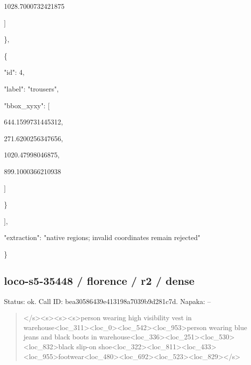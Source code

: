 \documentclass[10pt,a4paper]{article}
\begin{document}
        1028.7000732421875\par
      ]\par
    \},\allowbreak{}\par
    \{\par
      "id":\allowbreak{} 4,\allowbreak{}\par
      "label":\allowbreak{} "trousers",\allowbreak{}\par
      "bbox\_xyxy":\allowbreak{} [\par
        644.1599731445312,\allowbreak{}\par
        271.6200256347656,\allowbreak{}\par
        1020.47998046875,\allowbreak{}\par
        899.1000366210938\par
      ]\par
    \}\par
  ],\allowbreak{}\par
  "extraction":\allowbreak{} "native regions; invalid coordinates remain rejected"\par
\}
\subsection*{loco-s5-35448 / florence / r2 / dense}
Status: ok. Call ID: bea30586439e413198a7039b9d281c7d. Napaka: --
\begin{quote}\footnotesize
</s>\allowbreak{}<s>\allowbreak{}<s>\allowbreak{}<s>\allowbreak{}person wearing high visibility vest in warehouse<loc\_311>\allowbreak{}<loc\_0>\allowbreak{}<loc\_54\allowbreak{}2>\allowbreak{}<loc\_953>\allowbreak{}person wearing blue jeans and black boots in warehouse<loc\_336>\allowbreak{}<loc\_251>\allowbreak{}<loc\_\allowbreak{}530>\allowbreak{}<loc\_832>\allowbreak{}black slip-on shoe<loc\_322>\allowbreak{}<loc\_811>\allowbreak{}<loc\_433>\allowbreak{}<\allowbreak{}loc\_955>\allowbreak{}footwear<loc\_480>\allowbreak{}<loc\_69\allowbreak{}2>\allowbreak{}<loc\_523>\allowbreak{}<loc\_829>\allowbreak{}</s>\allowbreak{}
\end{quote}
\end{document}
